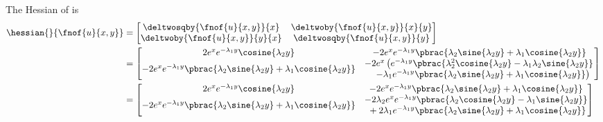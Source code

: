 The Hessian of  is
\begin{equation}
  \begin{aligned}
    \hessian{}{\fnof{u}{x,y}}&=\begin{bmatrix}
    \deltwosqby{\fnof{u}{x,y}}{x} & \deltwoby{\fnof{u}{x,y}}{x}{y} \\
    \deltwoby{\fnof{u}{x,y}}{y}{x} & \deltwosqby{\fnof{u}{x,y}}{y}
    \end{bmatrix} \\
    &=\begin{bmatrix}
    2e^{x}e^{-\lambda_{1}{y}}\cosine{\lambda_{2}y} &
    -2e^{x}e^{-\lambda_{1}{y}}\pbrac{\lambda_{2}\sine{\lambda_{2}y}+\lambda_{1}\cosine{\lambda_{2}y}} \\
    -2e^{x}e^{-\lambda_{1}{y}}\pbrac{\lambda_{2}\sine{\lambda_{2}y}+\lambda_{1}\cosine{\lambda_{2}y}} &
    \begin{matrix}
      -2e^{x}\left(e^{-\lambda_{1}{y}}\pbrac{\lambda_{2}^{2}\cosine{\lambda_{2}y}-\lambda_{1}\lambda_{2}\sine{\lambda_{2}y}}\right.\\
      \hfil{}\left.-\lambda_{1}e^{-\lambda_{1}{y}}\pbrac{\lambda_{2}\sine{\lambda_{2}y}+\lambda_{1}\cosine{\lambda_{2}y}}\right)
    \end{matrix}\end{bmatrix}\\
    &=\begin{bmatrix}
    2e^{x}e^{-\lambda_{1}{y}}\cosine{\lambda_{2}y} &
    -2e^{x}e^{-\lambda_{1}{y}}\pbrac{\lambda_{2}\sine{\lambda_{2}y}+\lambda_{1}\cosine{\lambda_{2}y}} \\
    -2e^{x}e^{-\lambda_{1}{y}}\pbrac{\lambda_{2}\sine{\lambda_{2}y}+\lambda_{1}\cosine{\lambda_{2}y}} &
    \begin{matrix}
      -2\lambda_{2}e^{x}e^{-\lambda_{1}{y}}\pbrac{\lambda_{2}\cosine{\lambda_{2}y}-\lambda_{1}\sine{\lambda_{2}y}}\\
      \hfil{}+2\lambda_{1}e^{-\lambda_{1}{y}}\pbrac{\lambda_{2}\sine{\lambda_{2}y}+\lambda_{1}\cosine{\lambda_{2}y}}
    \end{matrix}
    \end{bmatrix}
  \end{aligned}
  \label{eqn:GeneralisedLaplaceTwoDAnalyticHessian1}
\end{equation}

